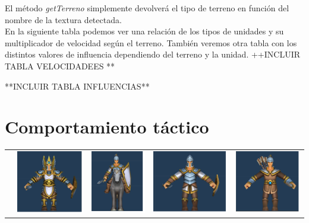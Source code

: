 El método \textit{getTerreno} simplemente devolverá el tipo de terreno en función del nombre de la textura detectada.\\

En la siguiente tabla podemos ver una relación de los tipos de unidades y su multiplicador de velocidad según el terreno. También veremos otra tabla con los distintos valores de influencia dependiendo del terreno y la unidad.
++INCLUIR TABLA VELOCIDADEES **

**INCLUIR TABLA INFLUENCIAS**


\section{Comportamiento táctico}

\begin{table}[H]
    \centering
    \begin{tabular}{|c|c|c|c|c|}
        \cline{2-5}        
        \multicolumn{1}{c|}{} & \includegraphics{imagesTable/infanteria} & \includegraphics{imagesTable/caballo} & \includegraphics{imagesTable/lancero} & \includegraphics{imagesTable/arquero} \\

\end{tabular}
\end{table}
